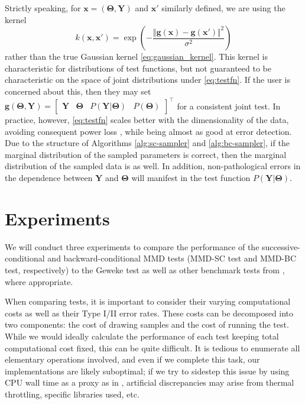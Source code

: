 \documentclass[a4paper,11pt]{article}
\begin{document}
Strictly speaking, for $\mathbf{x} = (\mathbf{\Theta}, \mathbf{Y})$ and $\mathbf{x}'$ similarly defined, we are using the kernel
\begin{equation}
    k(\mathbf{x}, \mathbf{x'}) = \exp{\left( -\frac{\Vert \mathbf{g}(\mathbf{x})-\mathbf{g}(\mathbf{x}') \Vert^{2}}{\sigma^{2}} \right)}
\end{equation}
rather than the true Gaussian kernel \eqref{eq:gaussian_kernel}. This kernel is characteristic for distributions of test functions, but not guaranteed to be characteristic on the space of joint distributions under \eqref{eq:testfn}. If the user is concerned about this, then they may set $\mathbf{g}(\mathbf{\Theta}, \mathbf{Y}) = \begin{bmatrix} \mathbf{Y} & \mathbf{\Theta} & P(\mathbf{Y}|\mathbf{\Theta}) & P(\mathbf{\Theta}) \end{bmatrix}^{\top}$ for a consistent joint test. In practice, however, \eqref{eq:testfn} scales better with the dimensionality of the data, avoiding consequent power loss \cite{reddi_decreasing_2014}, while being almost as good at error detection. Due to the structure of Algorithms \ref{alg:sc-sampler} and \ref{alg:bc-sampler}, if the marginal distribution of the sampled parameters is correct, then the marginal distribution of the sampled data is as well. In addition, non-pathological errors in the dependence between $\mathbf{Y}$ and $\mathbf{\Theta}$ will manifest in the test function $P(\mathbf{Y}|\mathbf{\Theta})$. 

\section{Experiments}
We will conduct three experiments to compare the performance of the successive-conditional and backward-conditional MMD tests (MMD-SC test and MMD-BC test, respectively) to the Geweke test as well as other benchmark tests from \cite{gandy_unit_2020}, where appropriate.

When comparing tests, it is important to consider their varying computational costs as well as their Type I/II error rates. These costs can be decomposed into two components: the cost of drawing samples and the cost of running the test. While we would ideally calculate the performance of each test keeping total computational cost fixed, this can be quite difficult. It is tedious to enumerate all elementary operations involved, and even if we complete this task, our implementations are likely suboptimal; if we try to sidestep this issue by using CPU wall time as a proxy as in \cite{gandy_unit_2020}, artificial discrepancies may arise from thermal throttling, specific libraries used, etc. 
\end{document}
